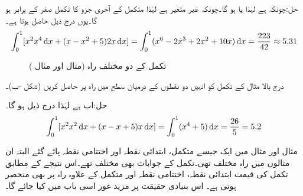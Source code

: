 حل:چونکہ  ہے لہٰذا  یا  ہو گا۔چونکہ  غیر متغیر ہے لہٰذا متکمل کے آخری جزو کا تکمل صفر کے برابر ہو گا۔یوں درج ذیل حاصل ہوتا ہے۔
\begin{align*}
\int_0^1[x^2 x^4\dif x+(x-x^2+5)2x\dif x]=\int_0^1 (x^6-2x^3+2x^2+10x)\dif x=\frac{223}{42}\approx 5.31
\end{align*}
%
\begin{figure}
\centering
{}
\caption{تکمل کے دو مختلف راہ (مثال  اور مثال )}
\label{شکل_خطی_تکمل_تکمل_مختلف_راہ}
\end{figure}
درج بالا مثال کے تکمل کو انہیں دو نقطوں کے درمیان  سطح  میں راہ  پر  حاصل کریں (شکل -ب)۔

حل:اب  ہے لہٰذا درج ذیل ہو گا۔
\begin{align*}
\int_0^1[x^2 x^2\dif x+(x-x+5)x\dif x]=\int_0^1 (x^4+5)\dif x=\frac{26}{5}=5.2
\end{align*}

مثال  اور مثال  میں ایک جیسے متکمل، ابتدائی نقطہ اور اختتامی نقطہ پائے گئے البتہ ان مثالوں میں راہ مختلف تھی۔تکمل کے جوابات بھی مختلف تھے۔اس نتیجے کے مطابق تکمل کی قیمت ابتدائی نقطہ، اختتامی نقطہ اور متکمل کے علاوہ راہ پر بھی منحصر ہوتی ہے۔ اس بنیادی حقیقت پر مزید غور اسی باب میں کیا جائے گا۔

